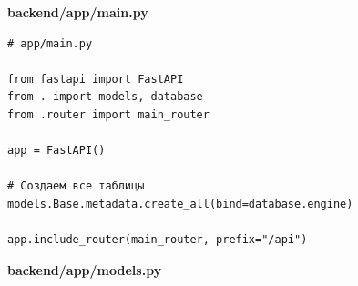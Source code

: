 \documentclass[coursework]{SCWorks}
\begin{document}
\begin{center}
\textbf{backend/app/main.py}
\end{center}
    
\begin{verbatim}
# app/main.py

from fastapi import FastAPI
from . import models, database
from .router import main_router

app = FastAPI()

# Создаем все таблицы
models.Base.metadata.create_all(bind=database.engine)

app.include_router(main_router, prefix="/api")
\end{verbatim}

\begin{center}
\textbf{backend/app/models.py}
\end{center}
\end{document}
